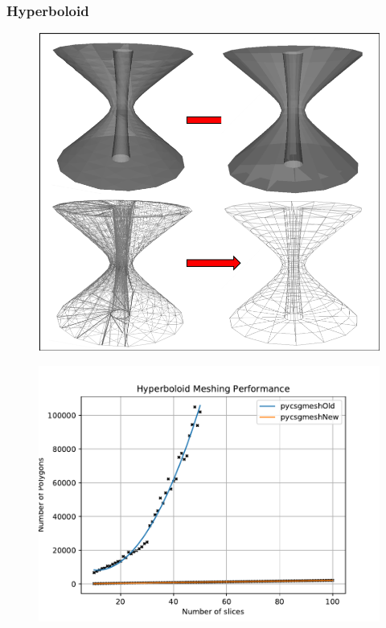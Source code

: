 \documentclass[12pt,a4paper]{article}
\begin{document}
\subsubsection{Hyperboloid}

\begin{figure}[h!]
\centering
\begin{minipage}{.2\textwidth}
  \centering
  \includegraphics[height=0.9\linewidth]{Images//Meshes//hyperboloid.png}
  \label{fig:test1}
\end{minipage}%
\begin{minipage}{.3\textwidth}
  \centering
  \includegraphics[scale=0.35]{Images//Quad_fits//Hyperboloid_quad.pdf}
  \label{fig:test2}
\end{minipage}%
\end{figure}
\end{document}
